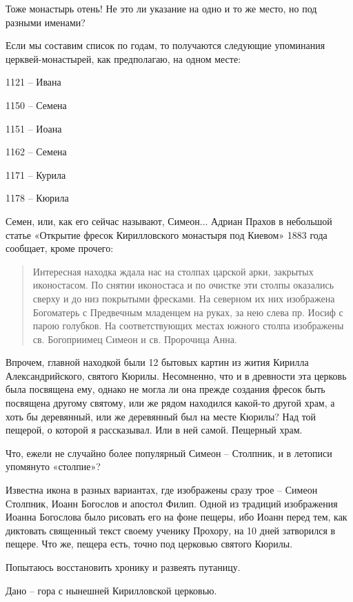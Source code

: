 \documentclass[a5paper,11pt,openany]{article}
\begin{document}
Тоже монастырь отень! Не это ли указание на одно и то же место, но под разными именами?

Если мы составим список по годам, то получаются следующие упоминания церквей-монастырей, как предполагаю, на одном месте:

\medskip

1121 – Ивана

1150 – Семена

1151 – Иоана

1162 – Семена

1171 – Курила

1178 – Кюрила

\medskip

Семен, или, как его сейчас называют, Симеон... Адриан Прахов в небольшой статье «Открытие фресок Кирилловского монастыря под Киевом» 1883 года сообщает, кроме прочего:

\begin{quotation}
\noindent Интересная находка ждала нас на столпах царской арки, закрытых иконостасом. По снятии иконостаса и по очистке эти столпы оказались сверху и до низ покрытыми фресками. На северном их них изображена Богоматерь с Предвечным младенцем на руках, за нею слева пр. Иосиф с парою голубков. На соответствующих местах южного столпа изображены св. Богоприимец Симеон и св. Пророчица Анна.
\end{quotation}

Впрочем, главной находкой были 12 бытовых картин из жития Кирилла Александрийского, святого Кюрилы. Несомненно, что и в древности эта церковь была посвящена ему, однако не могла ли она прежде создания фресок быть посвящена другому святому, или же рядом находился какой-то другой храм, а хоть бы деревянный, или же деревянный был на месте Кюрилы? Над той пещерой, о которой я рассказывал. Или в ней самой. Пещерный храм.

Что, ежели не случайно более популярный Симеон – Столпник, и в летописи упомянуто «столпие»?

Известна икона в разных вариантах, где изображены сразу трое – Симеон Столпник, Иоанн Богослов и апостол Филип. Одной из традиций изображения Иоанна Богослова было рисовать его на фоне пещеры, ибо Иоанн перед тем, как диктовать священный текст своему ученику Прохору, на 10 дней затворился в пещере. Что же, пещера есть, точно под церковью святого Кюрилы.

Попытаюсь восстановить хронику и развеять путаницу.

Дано – гора с нынешней Кирилловской церковью.
\end{document}

